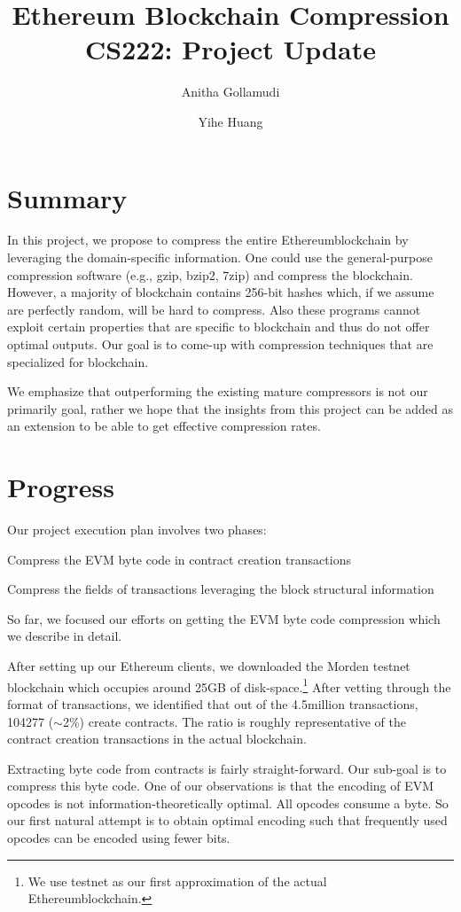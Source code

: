\documentclass[12pt]{article}
\title{Ethereum Blockchain Compression\\
	\large CS222: Project Update
	}
\author{Anitha Gollamudi 
	\and
	Yihe Huang}
\newcommand\peth{Ethereum}
\begin{document}
%

\maketitle

\section{Summary}
In this project, we propose to compress the entire \peth blockchain by leveraging the domain-specific information.
One could use the general-purpose compression software (e.g., gzip, bzip2, 7zip) and compress the blockchain.
However, a majority of blockchain contains 256-bit hashes which, if we assume are perfectly random, will be hard to compress.
Also these programs cannot exploit certain properties that are specific to blockchain and thus do not offer optimal outputs.
Our goal is to come-up with compression techniques that  are specialized for blockchain.

We emphasize that outperforming the existing mature compressors is not our primarily goal, rather
we hope that the insights from this project can be added as an extension to be able to get effective compression rates.   

\section{Progress}
Our project execution plan involves two phases: 
\begin{enumerate*}
	\item Compress the EVM byte code in contract creation transactions 
	\item Compress the fields of transactions leveraging the block structural information
\end{enumerate*}
So far, we focused our efforts on getting the EVM byte code compression which we describe in detail.

After setting up our Ethereum clients, we downloaded the Morden testnet blockchain which occupies around 25GB of disk-space.\footnote{We use testnet as our first approximation of the actual \peth blockchain.}
After vetting through the format of transactions, we identified that out of the 4.5million transactions,  104277 ($\sim$2\%) create contracts.
The ratio is roughly representative of the contract creation transactions in the actual blockchain.

Extracting byte code from contracts is fairly straight-forward. Our sub-goal is to compress this byte code.
One of our observations is that the encoding of EVM opcodes is not information-theoretically optimal. All opcodes consume a byte.
So our first natural attempt is to obtain optimal encoding such that frequently used opcodes can be encoded using fewer bits.
\end{document}
